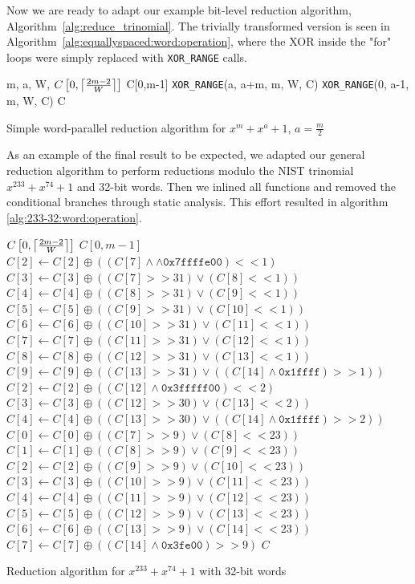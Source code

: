 Now we are ready to adapt our example bit-level reduction algorithm, Algorithm~\ref{alg:reduce_trinomial}. The trivially transformed version is seen in Algorithm~\ref{alg:equallyspaced:word:operation}, where the XOR inside the "for" loops were simply replaced with \texttt{XOR\_RANGE} calls. \\

\begin{algorithm}
\begin{algorithmic}[1]
  \REQUIRE m, a, W, $C\left[0,\ceil*{\frac{2m-2}{W}}\right]$
  \ENSURE C[0,m-1]
  \STATE \texttt{XOR\_RANGE}(a, a+m, m, W, C)
  \STATE \texttt{XOR\_RANGE}(0, a-1, m, W, C)
  \RETURN C
  \caption{Simple word-parallel reduction algorithm for $x^m + x^a +1$, $a = \frac{m}{2}$}
  \label{alg:equallyspaced:word:operation}
\end{algorithmic}
\end{algorithm}

As an example of the final result to be expected, we adapted our general reduction algorithm to perform reductions modulo the NIST trinomial $x^{233} + x^{74} + 1$ and 32-bit words. Then we inlined all functions and removed the conditional branches through static analysis. This effort resulted in algorithm \ref{alg:233-32:word:operation}. \\

\begin{algorithm}
\begin{algorithmic}[1]
  \REQUIRE $C\left[0,\ceil*{\frac{2m-2}{W}}\right]$
  \ENSURE $C[0,m-1]$
  \STATE $C[2] \gets C[2] \oplus ((C[7] \land\land \texttt{0x7ffffe00}) << 1)$
  \STATE $C[3] \gets C[3] \oplus ((C[7] >> 31) \lor (C[8] << 1))$
  \STATE $C[4] \gets C[4] \oplus ((C[8] >> 31) \lor (C[9] << 1))$
  \STATE $C[5] \gets C[5] \oplus ((C[9] >> 31) \lor (C[10] << 1))$
  \STATE $C[6] \gets C[6] \oplus ((C[10] >> 31) \lor (C[11] << 1))$
  \STATE $C[7] \gets C[7] \oplus ((C[11] >> 31) \lor (C[12] << 1))$
  \STATE $C[8] \gets C[8] \oplus ((C[12] >> 31) \lor (C[13] << 1))$
  \STATE $C[9] \gets C[9] \oplus ((C[13] >> 31) \lor ((C[14] \land \texttt{0x1ffff}) >> 1))$
  \STATE $C[2] \gets C[2] \oplus ((C[12] \land \texttt{0x3fffff00}) << 2)$
  \STATE $C[3] \gets C[3] \oplus ((C[12] >> 30) \lor (C[13] << 2))$
  \STATE $C[4] \gets C[4] \oplus ((C[13] >> 30) \lor ((C[14] \land \texttt{0x1ffff}) >> 2))$
  \STATE $C[0] \gets C[0] \oplus ((C[7] >> 9) \lor (C[8] << 23))$
  \STATE $C[1] \gets C[1] \oplus ((C[8] >> 9) \lor (C[9] << 23))$
  \STATE $C[2] \gets C[2] \oplus ((C[9] >> 9) \lor (C[10] << 23))$
  \STATE $C[3] \gets C[3] \oplus ((C[10] >> 9) \lor (C[11] << 23))$
  \STATE $C[4] \gets C[4] \oplus ((C[11] >> 9) \lor (C[12] << 23))$
  \STATE $C[5] \gets C[5] \oplus ((C[12] >> 9) \lor (C[13] << 23))$
  \STATE $C[6] \gets C[6] \oplus ((C[13] >> 9) \lor (C[14] << 23))$
  \STATE $C[7] \gets C[7] \oplus ((C[14] \land \texttt{0x3fe00}) >> 9)$
  \RETURN $C$
  \caption{Reduction algorithm for $x^{233} + x^{74} + 1$ with 32-bit words}
  \label{alg:233-32:word:operation}
\end{algorithmic}
\end{algorithm}

